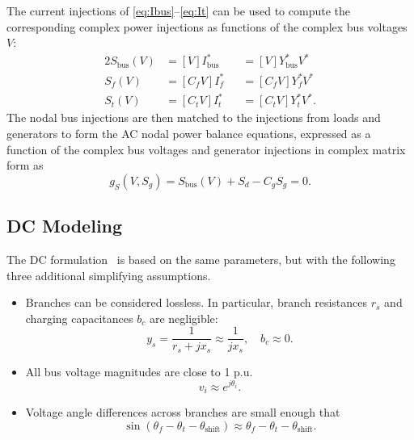 \documentclass[12pt]{article}
\newcommand{\diag}[1]{\left[{#1}\right]}                %
\numberwithin{equation}{section}
\numberwithin{table}{section}
\numberwithin{figure}{section}
\begin{document}
The current injections of \eqref{eq:Ibus}--\eqref{eq:It} can be used to compute the corresponding complex power injections as functions of the complex bus voltages $V$:
\begin{alignat}{2}
S_\mathrm{bus}(V) &= \diag{V}I_\mathrm{bus}^* &&= \diag{V}Y_\mathrm{bus}^* V^* \label{eq:Sbus} \\
S_f(V) &= \diag{C_f V}I_f^* &&= \diag{C_f V}Y_f^* V^* \label{eq:Sf} \\
S_t(V) &= \diag{C_t V}I_t^* &&= \diag{C_t V}Y_t^* V^*.  \label{eq:St}
\end{alignat}
The nodal bus injections are then matched to the injections from loads and generators to form the AC nodal power balance equations, expressed as a function of the complex bus voltages and generator injections in complex matrix form as
\begin{equation}
g_S(V, S_g) = S_\mathrm{bus}(V) + S_d - C_g S_g = 0.	\label{eq:acpf}
\end{equation}

\subsection{DC Modeling}

The DC formulation~\cite{wood1996} is based on the same parameters, but with the following three additional simplifying assumptions.

\begin{itemize}
\item Branches can be considered lossless. In particular, branch resistances $r_s$ and charging capacitances $b_c$ are negligible:
\begin{equation}
y_s = \frac{1}{r_s + j x_s} \approx \frac{1}{j x_s}, \quad b_c \approx 0.
\label{eq:lossless}
\end{equation}
\item All bus voltage magnitudes are close to 1 p.u.
\begin{equation}
v_i \approx e^{j \theta_i}.
\label{eq:V1}
\end{equation}
\item Voltage angle differences across branches are small enough that
\begin{equation}
\sin( \theta_f - \theta_t - \theta_\mathrm{shift}) \approx \theta_f - \theta_t - \theta_\mathrm{shift}.
\label{eq:sin}
\end{equation}
\end{itemize}
\end{document}
